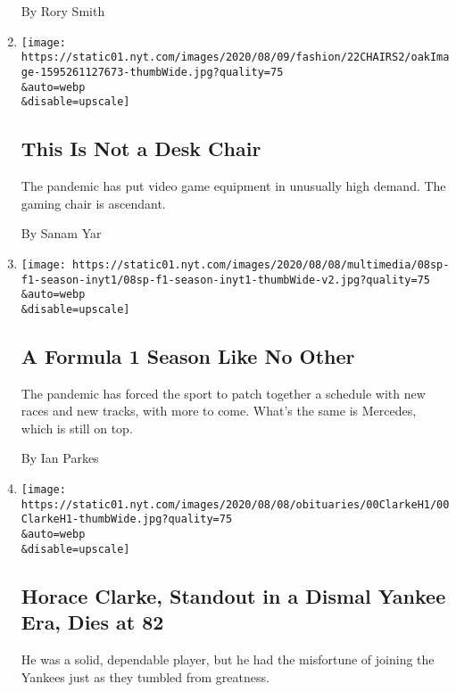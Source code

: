 \begin{enumerate}
  By Rory Smith
\item
  \href{/2020/08/07/style/gamer-chair-market-herman-miller.html}{}

  \texttt{[image: https://static01.nyt.com/images/2020/08/09/fashion/22CHAIRS2/oakImage-1595261127673-thumbWide.jpg?quality=75\\\&auto=webp\\\&disable=upscale]}

  \hypertarget{this-is-not-a-desk-chair}{%
  \subsection{This Is Not a Desk Chair}\label{this-is-not-a-desk-chair}}

  The pandemic has put video game equipment in unusually high demand.
  The gaming chair is ascendant.

  By Sanam Yar
\item
  \href{/2020/08/07/sports/autoracing/formula-1-season-coronavirus.html}{}

  \texttt{[image: https://static01.nyt.com/images/2020/08/08/multimedia/08sp-f1-season-inyt1/08sp-f1-season-inyt1-thumbWide-v2.jpg?quality=75\\\&auto=webp\\\&disable=upscale]}

  \hypertarget{a-formula-1-season-like-no-other}{%
  \subsection{A Formula 1 Season Like No
  Other}\label{a-formula-1-season-like-no-other}}

  The pandemic has forced the sport to patch together a schedule with
  new races and new tracks, with more to come. What's the same is
  Mercedes, which is still on top.

  By Ian Parkes
\item
  \href{/2020/08/07/sports/baseball/horace-clarke-dead.html}{}

  \texttt{[image: https://static01.nyt.com/images/2020/08/08/obituaries/00ClarkeH1/00ClarkeH1-thumbWide.jpg?quality=75\\\&auto=webp\\\&disable=upscale]}

  \hypertarget{horace-clarke-standout-in-a-dismal-yankee-era-dies-at-82}{%
  \subsection{Horace Clarke, Standout in a Dismal Yankee Era, Dies at
  82}\label{horace-clarke-standout-in-a-dismal-yankee-era-dies-at-82}}

  He was a solid, dependable player, but he had the misfortune of
  joining the Yankees just as they tumbled from greatness.


\end{enumerate}
